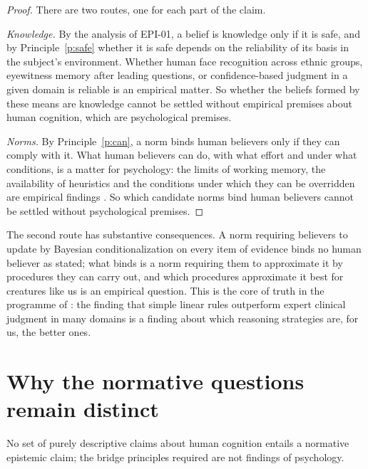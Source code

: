 \documentclass{situationist-preprint}
\begin{document}
\begin{proof}
There are two routes, one for each part of the claim.

\emph{Knowledge.} By the analysis of EPI-01, a belief is knowledge only if it is safe, and by Principle~\ref{p:safe} whether it is safe depends on the reliability of its basis in the subject's environment. Whether human face recognition across ethnic groups, eyewitness memory after leading questions, or confidence-based judgment in a given domain is reliable is an empirical matter. So whether the beliefs formed by these means are knowledge cannot be settled without empirical premises about human cognition, which are psychological premises.

\emph{Norms.} By Principle~\ref{p:can}, a norm binds human believers only if they can comply with it. What human believers can do, with what effort and under what conditions, is a matter for psychology: the limits of working memory, the availability of heuristics and the conditions under which they can be overridden are empirical findings \citep{TverskyKahneman1974}. So which candidate norms bind human believers cannot be settled without psychological premises.
\end{proof}

The second route has substantive consequences. A norm requiring believers to update by Bayesian conditionalization on every item of evidence binds no human believer as stated; what binds is a norm requiring them to approximate it by procedures they can carry out, and which procedures approximate it best for creatures like us is an empirical question. This is the core of truth in the programme of \citet{BishopTrout2005}: the finding that simple linear rules outperform expert clinical judgment in many domains is a finding about which reasoning strategies are, for us, the better ones.

\section{Why the normative questions remain distinct}

\begin{theorem}\label{t:distinct}
No set of purely descriptive claims about human cognition entails a normative epistemic claim; the bridge principles required are not findings of psychology.
\end{theorem}
\end{document}
